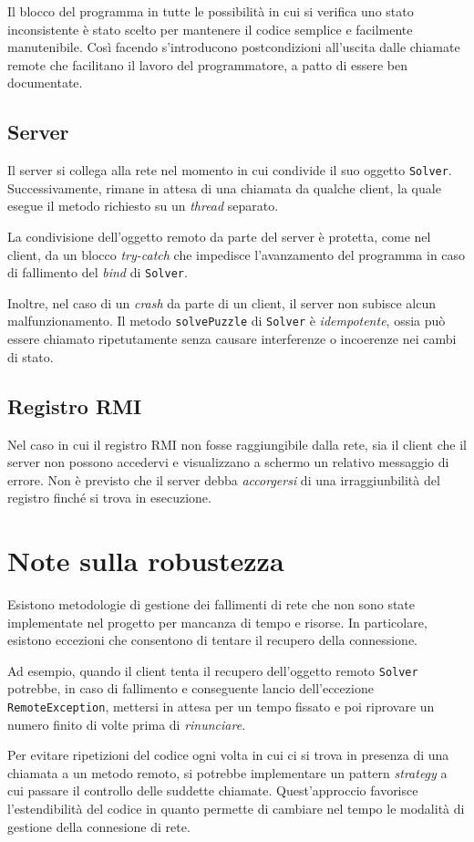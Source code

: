 \documentclass[a4paper, 12pt]{article}
\begin{document}
Il blocco del programma in tutte le possibilità in cui si verifica uno stato
inconsistente è stato scelto per mantenere il codice semplice e facilmente
manutenibile. Così facendo s'introducono postcondizioni all'uscita dalle
chiamate remote che facilitano il lavoro del programmatore, a patto di essere
ben documentate.
\subsection{Server}
Il server si collega alla rete nel momento in cui condivide il suo oggetto
\verb|Solver|. Successivamente, rimane in attesa di una chiamata da qualche
client, la quale esegue il metodo richiesto su un \emph{thread} separato.

La condivisione dell'oggetto remoto da parte del server è protetta, come nel
client, da un blocco \emph{try-catch} che impedisce l'avanzamento del
programma in caso di fallimento del \emph{bind} di \verb|Solver|.

Inoltre, nel caso di un \emph{crash} da parte di un client, il server non
subisce alcun malfunzionamento. Il metodo \verb|solvePuzzle| di \verb|Solver| è
\emph{idempotente}, ossia può essere chiamato ripetutamente senza causare
interferenze o incoerenze nei cambi di stato.
\subsection{Registro RMI}
Nel caso in cui il registro RMI non fosse raggiungibile dalla rete, sia il
client che il server non possono accedervi e visualizzano a schermo un
relativo messaggio di errore. Non è previsto che il server debba
\emph{accorgersi} di una irraggiunbilità del registro finché si trova in
esecuzione.
\section{Note sulla robustezza}
Esistono metodologie di gestione dei fallimenti di rete che non sono state
implementate nel progetto per mancanza di tempo e risorse. In particolare,
esistono eccezioni che consentono di tentare il recupero della connessione.

Ad esempio, quando il client tenta il recupero dell'oggetto remoto
\verb|Solver| potrebbe, in caso di fallimento e conseguente lancio
dell'eccezione \verb|RemoteException|, mettersi in attesa per un tempo fissato e
poi riprovare un numero finito di volte prima di \emph{rinunciare}.

Per evitare ripetizioni del codice ogni volta in cui ci si trova in presenza di
una chiamata a un metodo remoto, si potrebbe implementare un pattern
\emph{strategy} a cui passare il controllo delle suddette chiamate.
Quest'approccio favorisce l'estendibilità del codice in quanto permette di
cambiare nel tempo le modalità di gestione della connesione di rete.
\end{document}

